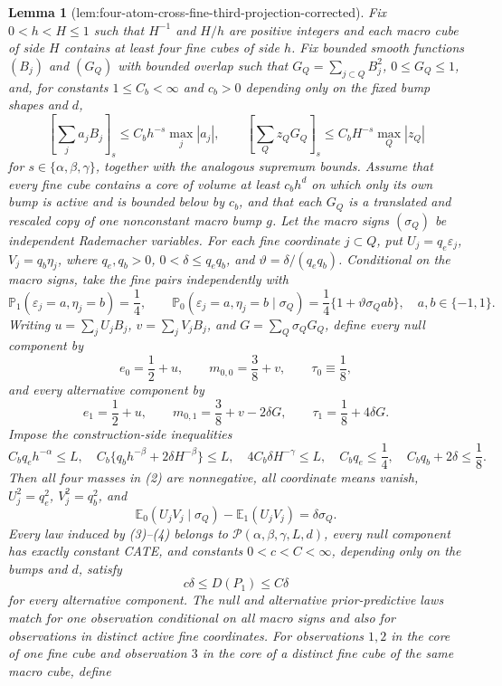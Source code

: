 \documentclass{article}
\newtheorem{lemma}{Lemma}
\begin{document}
\begin{lemma}[lem:four-atom-cross-fine-third-projection-corrected]\label{lem:four-atom-cross-fine-third-projection-corrected}
Fix \(0<h<H\leq1\) such that \(H^{-1}\) and \(H/h\) are positive integers and each macro cube of side \(H\) contains at least four fine cubes of side \(h\).  Fix bounded smooth functions \((B_j)\) and \((G_Q)\) with bounded overlap such that \(G_Q=\sum_{j\subset Q}B_j^2\), \(0\leq G_Q\leq1\), and, for constants \(1\leq C_b<\infty\) and \(c_b>0\) depending only on the fixed bump shapes and \(d\),
\[
 \left[\sum_j a_jB_j\right]_s\leq C_bh^{-s}\max_j|a_j|,
 \qquad
 \left[\sum_Q z_QG_Q\right]_s\leq C_bH^{-s}\max_Q|z_Q|
 \tag{1}
\]
for \(s\in\{\alpha,\beta,\gamma\}\), together with the analogous supremum bounds.  Assume that every fine cube contains a core of volume at least \(c_bh^d\) on which only its own bump is active and is bounded below by \(c_b\), and that each \(G_Q\) is a translated and rescaled copy of one nonconstant macro bump \(g\).  Let the macro signs \((\sigma_Q)\) be independent Rademacher variables.  For each fine coordinate \(j\subset Q\), put \(U_j=q_e\varepsilon_j\), \(V_j=q_b\eta_j\), where \(q_e,q_b>0\), \(0<\delta\leq q_eq_b\), and \(\vartheta=\delta/(q_eq_b)\).  Conditional on the macro signs, take the fine pairs independently with
\[
 \mathbb P_1(\varepsilon_j=a,\eta_j=b)=\frac14,
 \qquad
 \mathbb P_0(\varepsilon_j=a,\eta_j=b\mid\sigma_Q)
 =\frac14\{1+\vartheta\sigma_Qab\},
 \quad a,b\in\{-1,1\}.
 \tag{2}
\]
Writing \(u=\sum_jU_jB_j\), \(v=\sum_jV_jB_j\), and \(G=\sum_Q\sigma_QG_Q\), define every null component by
\[
 e_0=\frac12+u,
 \qquad m_{0,0}=\frac38+v,
 \qquad \tau_0\equiv\frac18,
 \tag{3}
\]
and every alternative component by
\[
 e_1=\frac12+u,
 \qquad m_{0,1}=\frac38+v-2\delta G,
 \qquad \tau_1=\frac18+4\delta G.
 \tag{4}
\]
Impose the construction-side inequalities
\[
 C_bq_eh^{-\alpha}\leq L,
 \quad C_b\{q_bh^{-\beta}+2\delta H^{-\beta}\}\leq L,
 \quad 4C_b\delta H^{-\gamma}\leq L,
 \quad C_bq_e\leq\frac14,
 \quad C_bq_b+2\delta\leq\frac18.
 \tag{5}
\]
Then all four masses in (2) are nonnegative, all coordinate means vanish, \(U_j^2=q_e^2\), \(V_j^2=q_b^2\), and
\[
 \mathbb E_0(U_jV_j\mid\sigma_Q)-\mathbb E_1(U_jV_j)
 =\delta\sigma_Q.
 \tag{6}
\]
Every law induced by (3)--(4) belongs to \(\mathcal P(\alpha,\beta,\gamma,L,d)\), every null component has exactly constant CATE, and constants \(0<c<C<\infty\), depending only on the bumps and \(d\), satisfy
\[
 c\delta\leq D(P_1)\leq C\delta
 \tag{7}
\]
for every alternative component.  The null and alternative prior-predictive laws match for one observation conditional on all macro signs and also for observations in distinct active fine coordinates.  For observations \(1,2\) in the core of one fine cube and observation \(3\) in the core of a distinct fine cube of the same macro cube, define

\end{lemma}
\end{document}
